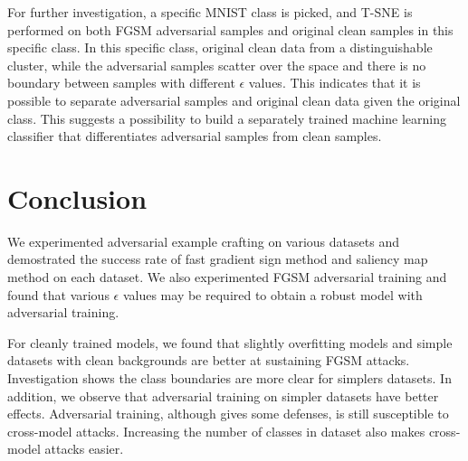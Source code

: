 \documentclass{article}
\begin{document}
For further investigation, a specific MNIST class is picked, and T-SNE is performed on both FGSM adversarial samples and original clean samples in this specific class.
In this specific class, original clean data from a distinguishable cluster, while the adversarial samples scatter over the space and there is no boundary between samples with different $\epsilon$ values.
This indicates that it is possible to separate adversarial samples and original clean data given the original class.
This suggests a possibility to build a separately trained machine learning classifier that differentiates adversarial samples from clean samples.


\section{Conclusion}

We experimented adversarial example crafting on various datasets and demostrated the success rate of fast gradient sign method and saliency map method on each dataset.
We also experimented FGSM adversarial training and found that various $\epsilon$ values may be required to obtain a robust model with adversarial training.

For cleanly trained models, we found that slightly overfitting models and simple datasets with clean backgrounds are better at sustaining FGSM attacks.
Investigation shows the class boundaries are more clear for simplers datasets.
In addition, we observe that adversarial training on simpler datasets have better effects.
Adversarial training, although gives some defenses, is still susceptible to cross-model attacks.
Increasing the number of classes in dataset also makes cross-model attacks easier.
\end{document}
